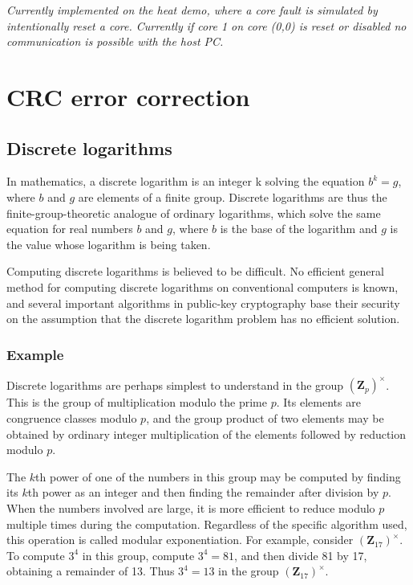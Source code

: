 \documentclass[a4paper, 11pt]{article}
\begin{document}
\emph{Currently implemented on the heat demo, where a core fault is simulated by intentionally reset a core. Currently if core 1 on core (0,0) is reset or disabled no communication is possible with the host PC.}


\clearpage
\section{CRC error correction}
\label{sec:crc}

\subsection{Discrete logarithms}
In mathematics, a discrete logarithm is an integer k solving the equation $b^k = g$, where $b$ and $g$ are elements of a finite group. Discrete logarithms are thus the finite-group-theoretic analogue of ordinary logarithms, which solve the same equation for real numbers $b$ and $g$, where $b$ is the base of the logarithm and $g$ is the value whose logarithm is being taken.

Computing discrete logarithms is believed to be difficult. No efficient general method for computing discrete logarithms on conventional computers is known, and several important algorithms in public-key cryptography base their security on the assumption that the discrete logarithm problem has no efficient solution.

\subsubsection{Example}
Discrete logarithms are perhaps simplest to understand in the group $(\mathbf{Z}_p)^\times$. This is the group of multiplication modulo the prime $p$. Its elements are congruence classes modulo $p$, and the group product of two elements may be obtained by ordinary integer multiplication of the elements followed by reduction modulo $p$.

The $k$th power of one of the numbers in this group may be computed by finding its $k$th power as an integer and then finding the remainder after division by $p$. When the numbers involved are large, it is more efficient to reduce modulo $p$ multiple times during the computation. Regardless of the specific algorithm used, this operation is called modular exponentiation. For example, consider $(\mathbf{Z}_{17})^\times$. To compute $3^4$ in this group, compute $3^4 = 81$, and then divide 81 by 17, obtaining a remainder of 13. Thus $3^4 = 13$ in the group $(\mathbf{Z}_{17})^\times$.
\end{document}
